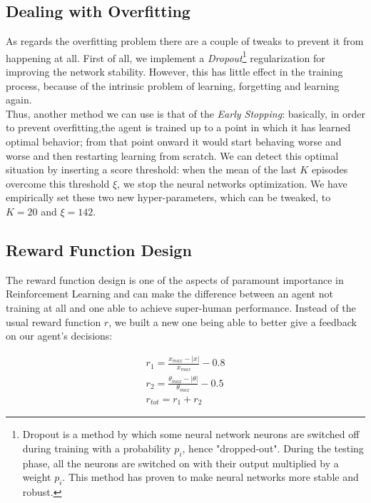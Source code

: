\subsection{Dealing with Overfitting}

As regards the overfitting problem there are a couple of tweaks to prevent it from happening at all. First of all, we implement a \textit{Dropout}\footnote{Dropout\cite{srivastava2014dropout} is a method by which some neural network neurons are switched off during training with a probability $p_i$, hence "dropped-out". During the testing phase, all the neurons are switched on with their output multiplied by a weight $p_i$. This method has proven to make neural networks more stable and robust.} regularization for improving the network stability. However, this has little effect in the training process, because of the intrinsic problem of learning, forgetting and learning again.
\\
\indent Thus, another method we can use is that of the \textit{Early Stopping}: basically, in order to prevent overfitting,the agent is trained up to a point in which it has learned optimal behavior; from that point onward it would start behaving worse and worse and then restarting learning from scratch. We can detect this optimal situation by inserting a score threshold: when the mean of the last $K$ episodes overcome this threshold $\xi$, we stop the neural networks optimization. We have empirically set these two new hyper-parameters, which can be tweaked, to $K = 20$ and $\xi= 142$.


\subsection{Reward Function Design}
The reward function design is one of the aspects of paramount importance in Reinforcement Learning and can make the difference between an agent not training at all and one able to achieve super-human performance. Instead of the usual reward function $r$, we built a new one being able to better give a feedback on our agent's decisions:

\begin{equation}
\label{eq:reward}
\begin{aligned}
	r_1 = \frac{x_{max} - |x|}{x_{max}} - 0.8 \\
	r_2 = \frac{\theta_{max} - |\theta|}{\theta_{max}} - 0.5 \\
	r_{tot} = r_1 + r_2 
\end{aligned}
\end{equation}

